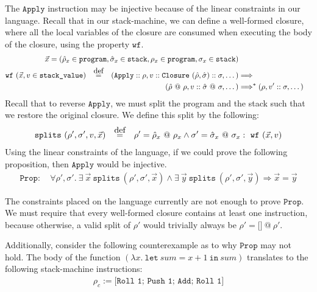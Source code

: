 \documentclass[11pt]{article}
\newcommand\myeq{\stackrel{\mathclap{\normalfont\mbox{def}}}{=}}
\begin{document}
The $\texttt{Apply}$ instruction may be injective because of the linear constraints in our language. Recall that in our stack-machine, we can define a well-formed closure, where all the local variables of the closure are consumed when executing the body of the closure, using the property $\texttt{wf}$.
\begin{align*}
    \vec{x} = (\hat{\rho}_x \in \texttt{program}, \hat{\sigma}_x \in \texttt{stack}, \rho_x \in \texttt{program}, \sigma_x \in \texttt{stack})\\
    \texttt{wf}\ (\vec{x}, v \in \texttt{stack\_value}) \quad \myeq \quad (\texttt{Apply}::\rho, v::\texttt{Closure}\ (\hat{\rho}, \hat{\sigma})::\sigma, \dots) &\Longrightarrow\\
    (\hat{\rho}\ @\ \rho, v::\hat{\sigma}\ @\ \sigma, \dots) &\Longrightarrow^* (\rho, v'::\sigma, \dots)
\end{align*}
Recall that to reverse $\texttt{Apply}$, we must split the program and the stack such that we restore the original closure. We define this split by the following:
\begin{align*}
    \texttt{splits}\ (\rho', \sigma', v, \vec{x}) \quad \myeq \quad \rho' = \hat{\rho}_x\ @\ \rho_x \wedge \sigma' = \hat{\sigma}_x\ @\ \sigma_x: \ \texttt{wf}\ (\vec{x}, v)
\end{align*}
Using the linear constraints of the language, if we could prove the following proposition, then $\texttt{Apply}$ would be injective.
\begin{align*}
    \texttt{Prop}: \quad \forall \rho', \sigma'.\ \exists\ \vec{x}\ \texttt{splits}\ (\rho', \sigma', \vec{x}) \wedge \exists\ \vec{y}\ \texttt{splits}\ (\rho', \sigma', \vec{y}) \Longrightarrow \vec{x} = \vec{y}
\end{align*}

The constraints placed on the language currently are not enough to prove $\texttt{Prop}$. We must require that every well-formed closure contains at least one instruction, because otherwise, a valid split of $\rho'$ would trivially always be $\rho' = \texttt{[]}\ @\ \rho'$.

Additionally, consider the following counterexample as to why $\texttt{Prop}$ may not hold. The body of the function $(\lambda x.\ \texttt{let}\ sum = x + 1\ \texttt{in}\ sum)$ translates to the following stack-machine instructions:
\begin{align*}
    \rho_c := \texttt{[Roll 1; Push 1; Add; Roll 1]}
\end{align*}
\end{document}
